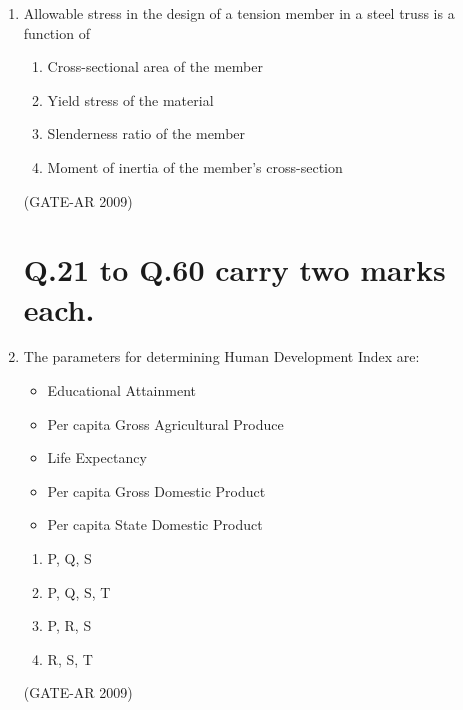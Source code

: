 \documentclass[a4paper,10pt]{article}
\begin{document}
\begin{enumerate}
	\item Allowable stress in the design of a tension member in a steel truss is a function of 
    \begin{enumerate}
        \item Cross-sectional area of the member
        \item Yield stress of the material
        \item Slenderness ratio of the member
        \item Moment of inertia of the member's cross-section
    \end{enumerate}
    \hfill (GATE-AR 2009)

\section*{Q.21 to Q.60 carry two marks each.}

    \item The parameters for determining Human Development Index are: 
    \begin{itemize}
        \item Educational Attainment
        \item Per capita Gross Agricultural Produce
        \item Life Expectancy
        \item Per capita Gross Domestic Product
        \item Per capita State Domestic Product
    \end{itemize}
    \begin{multicols}{4}
	\begin{enumerate}
        \item P, Q, S
        \item P, Q, S, T
        \item P, R, S
        \item R, S, T
    \end{enumerate}
	\end{multicols}
    \hfill (GATE-AR 2009)
    

\end{enumerate}
\end{document}

